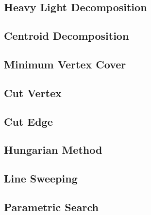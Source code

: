 \documentclass[10pt,landscape,a4paper,twocolumn]{article}
\begin{document}
\subsection{Heavy Light Decomposition}
\subsection{Centroid Decomposition}
\subsection{Minimum Vertex Cover}
\subsection{Cut Vertex}
\subsection{Cut Edge}
\subsection{Hungarian Method}
\subsection{Line Sweeping}
\subsection{Parametric Search}
\fi
\end{document}
